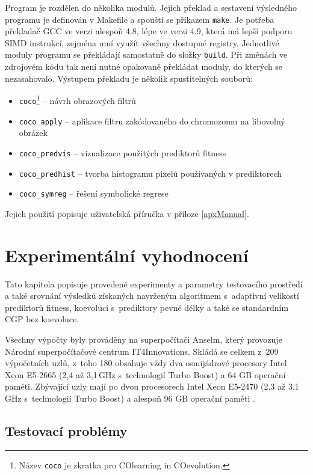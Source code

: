 Program je rozdělen do několika modulů. Jejich překlad a sestavení výsledného programu je definován v Makefile a spouští se příkazem \texttt{make}. Je potřeba překladač GCC ve verzi alespoň 4.8, lépe ve verzi 4.9, která má lepší podporu SIMD instrukcí, zejména umí využít všechny dostupné registry. Jednotlivé moduly programu se překládají samostatně do složky \texttt{build}. Při změnách ve zdrojovém kódu tak není nutné opakovaně překládat moduly, do kterých se nezasahovalo. Výstupem překladu je několik spustitelných souborů:

\begin{itemize}
    \item \texttt{coco}\footnote{Název \texttt{coco} je zkratka pro COlearning in COevolution.} -- návrh obrazových filtrů
    \item \texttt{coco\_apply} -- aplikace filtru zakódovaného do chromozomu na libovolný obrázek
    \item \texttt{coco\_predvis} -- vizualizace použitých prediktorů fitness
    \item \texttt{coco\_predhist} -- tvorba histogramu pixelů používaných v prediktorech
    \item \texttt{coco\_symreg} -- řešení symbolické regrese
\end{itemize}

Jejich použití popisuje uživatelská příručka v příloze \ref{apxManual}.

\chapter{Experimentální vyhodnocení}
\label{chExperiments}

Tato kapitola popisuje provedené experimenty a parametry testovacího prostředí a také srovnání výsledků získaných navrženým algoritmem s~adaptivní velikostí prediktorů fitness, koevolucí s~prediktory pevné délky a také se standardním CGP bez koevoluce.

Všechny výpočty byly prováděny na superpočítači Anselm, který provozuje Národní superpočítačové centrum IT4Innovations. Skládá se celkem z~209 výpočetních uzlů, z~toho 180 obsahuje vždy dva osmijádrové procesory Intel Xeon E5-2665 (2,4 až 3,1\,GHz s~technologií Turbo Boost) a 64 GB operační paměti. Zbývající uzly mají po dvou procesorech Intel Xeon E5-2470 (2,3 až 3,1\,GHz s~technologií Turbo Boost) a alespoň 96 GB operační paměti \cite{AnselmSpecs}.

\section{Testovací problémy}

